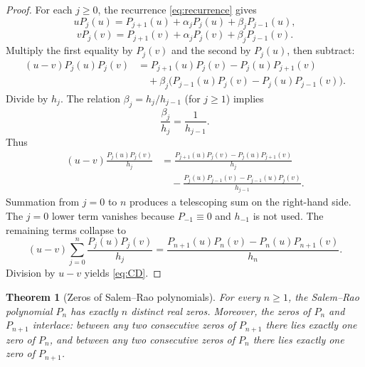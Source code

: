 \documentclass[11pt]{amsart}
\numberwithin{equation}{section}
\newtheorem{theorem}{Theorem}[section]
\theoremstyle{definition}
\begin{document}
\begin{proof}
For each $j\ge 0$, the recurrence \eqref{eq:recurrence} gives
\[
uP_{j}(u)=P_{j+1}(u)+\alpha_{j}P_{j}(u)+\beta_{j}P_{j-1}(u),
\]
\[
vP_{j}(v)=P_{j+1}(v)+\alpha_{j}P_{j}(v)+\beta_{j}P_{j-1}(v).
\]
Multiply the first equality by $P_{j}(v)$ and the second by $P_{j}(u)$, then
subtract:
\begin{align*}
(u-v)P_{j}(u)P_{j}(v)
&=P_{j+1}(u)P_{j}(v)-P_{j}(u)P_{j+1}(v)\\
&\quad+\beta_{j}\bigl(P_{j-1}(u)P_{j}(v)-P_{j}(u)P_{j-1}(v)\bigr).
\end{align*}
Divide by $h_{j}$. The relation $\beta_{j}=h_{j}/h_{j-1}$ (for $j\ge 1$)
implies
\[
\frac{\beta_{j}}{h_{j}}=\frac{1}{h_{j-1}}.
\]
Thus
\begin{align*}
(u-v)\frac{P_{j}(u)P_{j}(v)}{h_{j}}
&=\frac{P_{j+1}(u)P_{j}(v)-P_{j}(u)P_{j+1}(v)}{h_{j}}\\
&\quad-\frac{P_{j}(u)P_{j-1}(v)-P_{j-1}(u)P_{j}(v)}{h_{j-1}}.
\end{align*}
Summation from $j=0$ to $n$ produces a telescoping sum on the right-hand
side. The $j=0$ lower term vanishes because $P_{-1}\equiv 0$ and $h_{-1}$ is
not used. The remaining terms collapse to
\[
(u-v)\sum_{j=0}^{n}\frac{P_{j}(u)P_{j}(v)}{h_{j}}
=\frac{P_{n+1}(u)P_{n}(v)-P_{n}(u)P_{n+1}(v)}{h_{n}}.
\]
Division by $u-v$ yields \eqref{eq:CD}.
\end{proof}

\begin{theorem}[Zeros of Salem--Rao polynomials]\label{thm:zeros}
For every $n\ge 1$, the Salem--Rao polynomial $P_{n}$ has exactly $n$ distinct
real zeros. Moreover, the zeros of $P_{n}$ and $P_{n+1}$ interlace: between
any two consecutive zeros of $P_{n+1}$ there lies exactly one zero of $P_{n}$,
and between any two consecutive zeros of $P_{n}$ there lies exactly one zero
of $P_{n+1}$.
\end{theorem}
\end{document}
